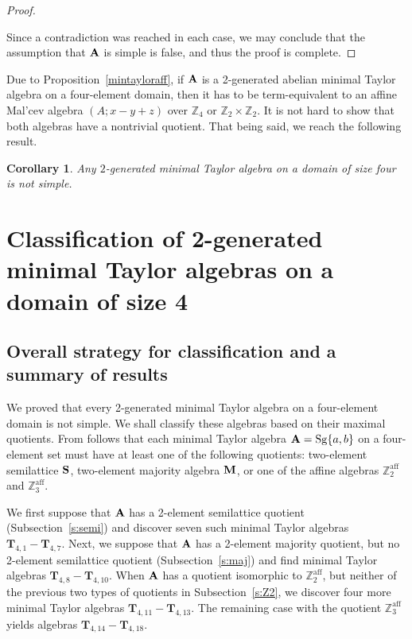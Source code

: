 \documentclass[11pt]{amsart}
\newcommand{\m}[1]{\mathbf{\uppercase{#1}}}
\newtheorem{cor}[thm]{Corollary}
\theoremstyle{definition}
\theoremstyle{remark}
\theoremstyle{plain}
\def\T{\mathbf{T}}
\begin{document}
\begin{proof}
\begin{enumerate}[wide, labelwidth=!,itemindent=!,labelindent=0pt]
\begin{enumerate}[wide, labelwidth=!,labelindent=0pt,itemindent=!]
\begin{enumerate}[wide, labelwidth=!,labelindent=0pt,itemindent=!]
\begin{itemize}[leftmargin=*]
\end{itemize}
\end{enumerate}
\end{enumerate}

\end{enumerate}

Since a contradiction was reached in each case, we may conclude that the assumption that $\m a$ is simple is false, and thus the proof is complete.
\end{proof}
Due to Proposition~\ref{mintayloraff}, if $\m a$ is a 2-generated abelian minimal Taylor algebra on a four-element domain, then it has to be term-equivalent to an affine Mal'cev algebra $(A;x-y+z)$ over $\mathbb{Z}_4$ or $\mathbb{Z}_2\times \mathbb{Z}_2$. It is not hard to show that both algebras have a nontrivial quotient. That being said, we reach the following result.
\begin{cor}\label{notsimplecor}
Any $2$-generated minimal Taylor algebra on a domain of size four is not simple.
\end{cor}

\section{Classification of 2-generated minimal Taylor algebras on a domain of size 4}

\subsection{Overall strategy for classification and a summary of results}

We proved that every 2-generated minimal Taylor algebra on a four-element domain is not simple. We shall classify these algebras based on their maximal quotients. From  follows that each minimal Taylor algebra $\m a=\mathrm{Sg}\{a,b\}$ on a four-element set must have at least one of the following quotients: two-element semilattice $\m s$, two-element majority algebra $\m m$, or one of the affine algebras $\mathbb{Z}_2^{\text{aff}}$ and $\mathbb{Z}_3^{\text{aff}}$.

We first suppose that $\m a$ has a 2-element semilattice quotient (Subsection~\ref{s:semi}) and discover seven such minimal Taylor algebras $\T_{4,1}-\T_{4,7}$. Next, we suppose that $\m a$ has a 2-element majority quotient, but no 2-element semilattice quotient (Subsection~\ref{s:maj}) and find minimal Taylor algebras $\T_{4,8}-\T_{4,10}$. When $\m a$ has a quotient isomorphic to  $\mathbb{Z}_2^{\text{aff}}$, but neither of the previous two types of quotients in Subsection~\ref{s:Z2}, we discover four more minimal Taylor algebras $\T_{4,11}-\T_{4,13}$. The remaining case with the quotient $\mathbb{Z}_3^{\text{aff}}$ yields algebras $\T_{4,14}-\T_{4,18}$.
\end{document}

